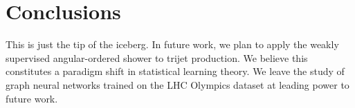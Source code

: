 \section{Conclusions}\label{sec:conclusions}

This is just the tip of the iceberg. In future work, we plan to apply
the weakly supervised angular-ordered shower to trijet production. We
believe this constitutes a paradigm shift in statistical learning
theory. We leave the study of graph neural networks trained on the LHC
Olympics dataset at leading power to future work.

